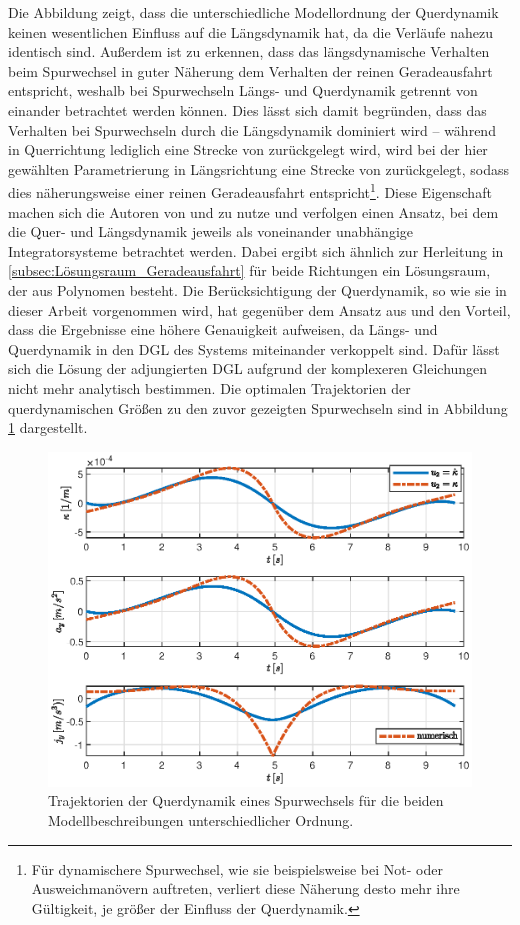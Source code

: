 Die Abbildung zeigt, dass die unterschiedliche Modellordnung der Querdynamik keinen wesentlichen Einfluss auf die Längsdynamik hat, da die Verläufe nahezu identisch sind. Außerdem ist zu erkennen, dass das längsdynamische Verhalten beim Spurwechsel in guter Näherung dem Verhalten der reinen Geradeausfahrt entspricht, weshalb bei Spurwechseln Längs- und Querdynamik getrennt von einander betrachtet werden können. Dies lässt sich damit begründen, dass das Verhalten bei Spurwechseln durch die Längsdynamik dominiert wird -- während in Querrichtung lediglich eine Strecke von  zurückgelegt wird, wird bei der hier gewählten Parametrierung in Längsrichtung eine Strecke von  zurückgelegt, sodass dies näherungsweise einer reinen Geradeausfahrt entspricht\footnote{Für dynamischere Spurwechsel, wie sie beispielsweise bei Not- oder Ausweichmanövern auftreten, verliert diese Näherung desto mehr ihre Gültigkeit, je größer der Einfluss der Querdynamik.}. Diese Eigenschaft machen sich die Autoren von \cite{Rathgeber.2016} und \cite{Werling.2011} zu nutze und verfolgen einen Ansatz, bei dem die Quer- und Längsdynamik jeweils als voneinander unabhängige Integratorsysteme betrachtet werden. Dabei ergibt sich ähnlich zur Herleitung in \ref{subsec:Lösungsraum_Geradeausfahrt} für beide Richtungen ein Lösungsraum, der aus Polynomen besteht. Die Berücksichtigung der Querdynamik, so wie sie in dieser Arbeit vorgenommen wird, hat gegenüber dem Ansatz aus \cite{Rathgeber.2016} und \cite{Werling.2011} den Vorteil, dass die Ergebnisse eine höhere Genauigkeit aufweisen, da Längs- und Querdynamik in den \gls{DGL} des Systems miteinander verkoppelt sind. Dafür lässt sich die Lösung der adjungierten \gls{DGL} aufgrund der komplexeren Gleichungen nicht mehr analytisch bestimmen. Die optimalen Trajektorien der querdynamischen Größen zu den zuvor gezeigten Spurwechseln sind in Abbildung \ref{fig:lat_dyn_s300_v30_ohne_dkappa} dargestellt.
\begin{figure}[h] 
	\centering
	\includegraphics[width=\linewidth]{./Bilder/Ergebnisse/Geradeausfahrt/Spurwechsel/lat_dyn_s300_v30_ohne_dkappa.eps}
	\caption{Trajektorien der Querdynamik eines Spurwechsels für die beiden Modellbeschreibungen unterschiedlicher Ordnung.}
	\label{fig:lat_dyn_s300_v30_ohne_dkappa}
\end{figure} 
